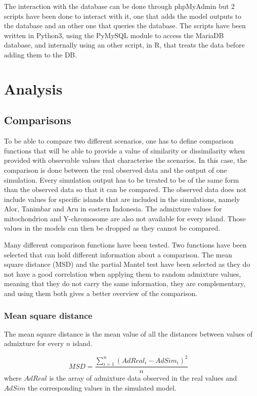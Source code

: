 \documentclass[a4paper,12pt]{report}
\begin{document}
The interaction with the database can be done through phpMyAdmin but 2 scripts have been done to interact with it, one that adds the model outputs to the database and an other one that queries the database. The scripts have been written in Python3, using the PyMySQL module to access the MariaDB database, and internally using an other script, in R, that treats the data before adding them to the DB.


\section{Analysis}


\subsection{Comparisons}
\label{subsection:comparisons}
To be able to compare two different scenarios, one has to define comparison functions that will be able to provide a value of similarity or dissimilarity when provided with observable values that characterise the scenarios. In this case, the comparison is done between the real observed data and the output of one simulation.
Every simulation output has to be treated to be of the same form than the observed data so that it can be compared. The observed data does not include values for specific islands that are included in the simulations, namely Alor, Tanimbar and Aru in eastern Indonesia. The admixture values for mitochondrion and Y-chromosome are also not available for every island.
Those values in the models can then be dropped as they cannot be compared.

Many different comparison functions have been tested. Two functions have been selected that can hold different information about a comparison. The mean square distance (MSD) and the partial Mantel test have been selected as they do not have a good correlation when applying them to random admixture values, meaning that they do not carry the same information, they are complementary, and using them both gives a better overview of the comparison.

\subsubsection{Mean square distance}
The mean square distance is the mean value of all the distances between values of admixture for every $n$ island.

\begin{equation}
MSD = \frac{\sum\limits_{i=1}^{n} (AdReal_i - AdSim_i) ^ 2}{n}
\end{equation}
where $AdReal$ is the array of admixture data observed in the real values and $AdSim$ the corresponding values in the simulated model.
\end{document}
